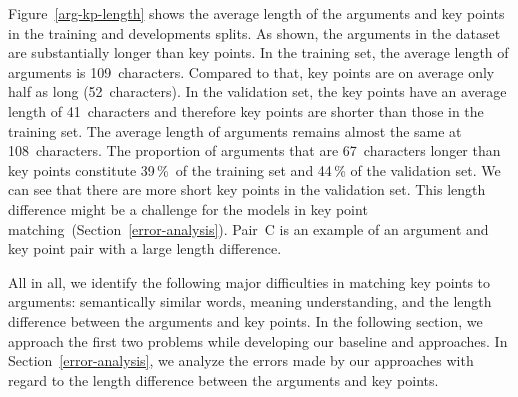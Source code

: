 Figure~\ref{arg-kp-length} shows the average length of the arguments and key points in the training and developments splits. As shown, the arguments in the \ArgKP dataset are substantially longer than key points.
In the training set, the average length of arguments is 109~characters. 
Compared to that, key points are on average only half as long (52~characters). 
In the validation set, the key points have an average length of 41~characters and therefore key points are shorter than those in the training set. 
The average length of arguments remains almost the same at 108~characters. 
The proportion of arguments that are 67~characters longer than key points constitute 39\,\%~of the training set 
and 44\,\% of the validation set. 
We can see that there are more short key points in the validation set. 
This length difference might be a challenge for the models in key point matching~(Section~\ref{error-analysis}). Pair~C is an example of an argument and key point pair with a large length difference.

All in all, we identify the following major difficulties in matching key points to arguments: semantically similar words, meaning understanding, and the length difference between the arguments and key points. In the following section, we approach the first two problems while developing our baseline and approaches. In Section~\ref{error-analysis}, we analyze the errors made by our approaches with regard to the length difference between the arguments and key points.